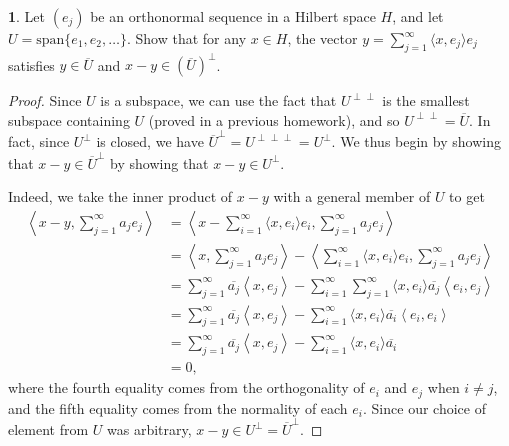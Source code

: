 \documentclass[12pt]{article}
\theoremstyle{definition}
\newtheorem{ex}{}
\begin{document}
\begin{ex}
	Let $(e_j)$ be an orthonormal sequence in a Hilbert space $H$, and let $U = \mathrm{span}\lbrace e_1, e_2, \dots \rbrace$.
	Show that for any $x \in H$, the vector $y = \sum_{j=1}^\infty \langle x, e_j\rangle e_j$ satisfies $y \in \overline{U}$ and $x - y \in (\overline{U})^\perp$.
\end{ex}
\begin{proof}
	Since $U$ is a subspace, we can use the fact that $U^{\perp\perp}$ is the smallest subspace containing $U$ (proved in a previous homework), and so $U^{\perp\perp} = \overline{U}$.
	In fact, since $U^\perp$ is closed, we have $\overline{U}^\perp = U^{\perp\perp\perp} = U^\perp$.
	We thus begin by showing that $x - y \in \overline{U}^\perp$ by showing that $x - y \in U^\perp$.

	Indeed, we take the inner product of $x - y$ with a general member of $U$ to get \begin{align*}
		\left\langle x - y, \sum_{j=1}^\infty a_je_j \right\rangle & = \left\langle x - \sum_{i=1}^\infty \langle x, e_i \rangle e_i, \sum_{j=1}^\infty a_je_j \right\rangle                                                                              \\
		                                                           & = \left\langle x, \sum_{j=1}^\infty a_je_j \right\rangle - \left\langle \sum_{i=1}^\infty \langle x, e_i \rangle e_i, \sum_{j=1}^\infty a_je_j \right\rangle                         \\
		                                                           & = \sum_{j=1}^\infty \overline{a_j} \left\langle x, e_j \right\rangle - \sum_{i=1}^\infty \sum_{j=1}^\infty \langle x, e_i \rangle \overline{a_j} \left\langle e_i, e_j \right\rangle \\
		                                                           & = \sum_{j=1}^\infty \overline{a_j} \left\langle x, e_j \right\rangle - \sum_{i=1}^\infty \langle x, e_i \rangle \overline{a_i} \left\langle e_i, e_i \right\rangle                   \\
		                                                           & = \sum_{j=1}^\infty \overline{a_j} \left\langle x, e_j \right\rangle - \sum_{i=1}^\infty \langle x, e_i \rangle \overline{a_i}                                                       \\
		                                                           & = 0,
	\end{align*}
	where the fourth equality comes from the orthogonality of $e_i$ and $e_j$ when $i \neq j$, and the fifth equality comes from the normality of each $e_i$.
	Since our choice of element from $U$ was arbitrary, $x - y \in U^\perp = \overline{U}^\perp$.
\end{proof}
\end{document}
